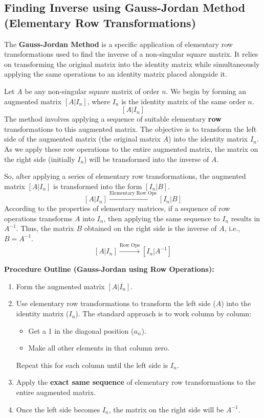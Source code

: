 \documentclass{article}
\begin{document}
\subsection{Finding Inverse using Gauss-Jordan Method (Elementary Row Transformations)} %

The \textbf{Gauss-Jordan Method} is a specific application of elementary row transformations used to find the inverse of a non-singular square matrix. It relies on transforming the original matrix into the identity matrix while simultaneously applying the same operations to an identity matrix placed alongside it.

Let $A$ be any non-singular square matrix of order $n$. We begin by forming an augmented matrix $[A | I_n]$, where $I_n$ is the identity matrix of the same order $n$.
\[ [A | I_n] \]
The method involves applying a sequence of suitable elementary \textbf{row} transformations to this augmented matrix. The objective is to transform the left side of the augmented matrix (the original matrix $A$) into the identity matrix $I_n$. As we apply these row operations to the entire augmented matrix, the matrix on the right side (initially $I_n$) will be transformed into the inverse of $A$.

So, after applying a series of elementary row transformations, the augmented matrix $[A | I_n]$ is transformed into the form $[I_n | B]$.
\[ [A | I_n] \xrightarrow{\text{Elementary Row Ops}} [I_n | B] \]
According to the properties of elementary matrices, if a sequence of row operations transforms $A$ into $I_n$, then applying the same sequence to $I_n$ results in $A^{-1}$. Thus, the matrix $B$ obtained on the right side is the inverse of $A$, i.e., $B = A^{-1}$.
\[ [A | I_n] \xrightarrow{\text{Row Ops}} [I_n | A^{-1}] \]

\textbf{Procedure Outline (Gauss-Jordan using Row Operations):}
\begin{enumerate}
    \item Form the augmented matrix $[A | I_n]$.
    \item Use elementary row transformations to transform the left side ($A$) into the identity matrix ($I_n$). The standard approach is to work column by column:
    \begin{itemize}
        \item Get a 1 in the diagonal position ($a_{ii}$).
        \item Make all other elements in that column zero.
    \end{itemize}
    Repeat this for each column until the left side is $I_n$.
    \item Apply the \textbf{exact same sequence} of elementary row transformations to the entire augmented matrix.
    \item Once the left side becomes $I_n$, the matrix on the right side will be $A^{-1}$.
\end{enumerate}
\end{document}
